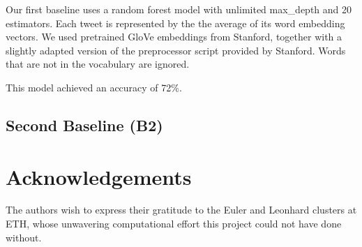 \documentclass[10pt,conference,compsocconf]{IEEEtran}
\begin{document}
Our first baseline uses a random forest model with unlimited max\_depth and 20 estimators.
Each tweet is represented by the the average of its word embedding vectors.
We used pretrained GloVe \cite{glove} embeddings from Stanford,
together with a slightly adapted version of the preprocessor script
provided by Stanford.
Words that are not in the vocabulary are ignored.

This model achieved an accuracy of 72\%.


\subsection{Second Baseline (B2)}

\section*{Acknowledgements}
The authors wish to express their gratitude to the Euler and Leonhard
clusters at ETH, whose unwavering computational effort this project
could not have done without.



\end{document}

